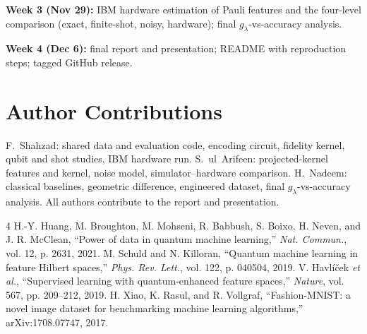 \documentclass[conference]{IEEEtran}
\begin{document}
\textbf{Week 3 (Nov 29):} IBM hardware estimation of Pauli features and the four-level comparison (exact, finite-shot, noisy, hardware); final $g_\lambda$-vs-accuracy analysis.

\textbf{Week 4 (Dec 6):} final report and presentation; README with reproduction steps; tagged GitHub release.

\section*{Author Contributions}
F.~Shahzad: shared data and evaluation code, encoding circuit, fidelity kernel, qubit and shot studies, IBM hardware run. S.~ul~Arifeen: projected-kernel features and kernel, noise model, simulator--hardware comparison. H.~Nadeem: classical baselines, geometric difference, engineered dataset, final $g_\lambda$-vs-accuracy analysis. All authors contribute to the report and presentation.

\begin{thebibliography}{4}
 H.-Y. Huang, M. Broughton, M. Mohseni, R. Babbush, S. Boixo, H. Neven, and J. R. McClean, ``Power of data in quantum machine learning,'' \textit{Nat. Commun.}, vol. 12, p. 2631, 2021.
 M. Schuld and N. Killoran, ``Quantum machine learning in feature Hilbert spaces,'' \textit{Phys. Rev. Lett.}, vol. 122, p. 040504, 2019.
 V. Havl\'{i}\v{c}ek \textit{et al.}, ``Supervised learning with quantum-enhanced feature spaces,'' \textit{Nature}, vol. 567, pp. 209--212, 2019.
 H. Xiao, K. Rasul, and R. Vollgraf, ``Fashion-MNIST: a novel image dataset for benchmarking machine learning algorithms,'' arXiv:1708.07747, 2017.
\end{thebibliography}
\end{document}
